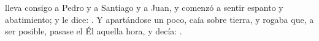  lleva consigo a Pedro y a Santiago y a Juan, y comenzó a sentir espanto y abatimiento; y le dice: . Y apartándose un poco, caía sobre tierra, y rogaba que, a ser posible, pasase el Él aquella hora, y decía: .